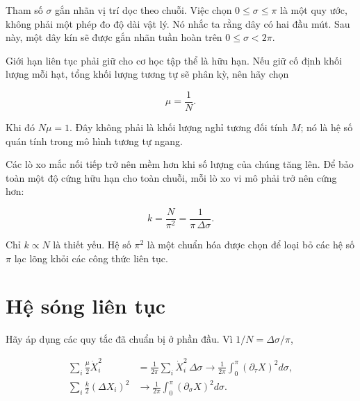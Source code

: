 Tham số \(\sigma\) gắn nhãn vị trí dọc theo chuỗi. Việc chọn \(0\leq\sigma\leq\pi\) là một quy ước, không phải một phép đo độ dài vật lý. Nó nhắc ta rằng dây có hai đầu mút. Sau này, một dây kín sẽ được gắn nhãn tuần hoàn trên \(0\leq\sigma<2\pi\).

Giới hạn liên tục phải giữ cho cơ học tập thể là hữu hạn. Nếu giữ cố định khối lượng mỗi hạt, tổng khối lượng tương tự sẽ phân kỳ, nên hãy chọn

\begin{equation}
  \mu=\frac{1}{N}.
  \label{eq:l02-mu-scaling}
\end{equation}

Khi đó \(N\mu=1\). Đây không phải là khối lượng nghỉ tương đối tính \(M\); nó là hệ số quán tính trong mô hình tương tự ngang.

Các lò xo mắc nối tiếp trở nên mềm hơn khi số lượng của chúng tăng lên. Để bảo toàn một độ cứng hữu hạn cho toàn chuỗi, mỗi lò xo vi mô phải trở nên cứng hơn:

\begin{equation}
  k=\frac{N}{\pi^2}
  =\frac{1}{\pi\,\Delta\sigma}.
  \label{eq:l02-k-scaling}
\end{equation}

Chỉ \(k\propto N\) là thiết yếu. Hệ số \(\pi^2\) là một chuẩn hóa được chọn để loại bỏ các hệ số \(\pi\) lạc lõng khỏi các công thức liên tục.

\begin{classroomqa}
\end{classroomqa}

\section{Hệ sóng liên tục}

Hãy áp dụng các quy tắc đã chuẩn bị ở phần đầu. Vì \(1/N=\Delta\sigma/\pi\),

\begin{align}
  \sum_i\frac{\mu}{2}\dot X_i^2
  &=
  \frac{1}{2\pi}
  \sum_i\dot X_i^2\,\Delta\sigma
  \longrightarrow
  \frac{1}{2\pi}
  \int_0^\pi
  \left(\partial_\tau X\right)^2d\sigma ,
  \label{eq:l02-kinetic-limit}\\
  \sum_i\frac{k}{2}(\Delta X_i)^2
  &\longrightarrow
  \frac{1}{2\pi}
  \int_0^\pi
  \left(\partial_\sigma X\right)^2d\sigma .
  \label{eq:l02-potential-limit}
\end{align}

